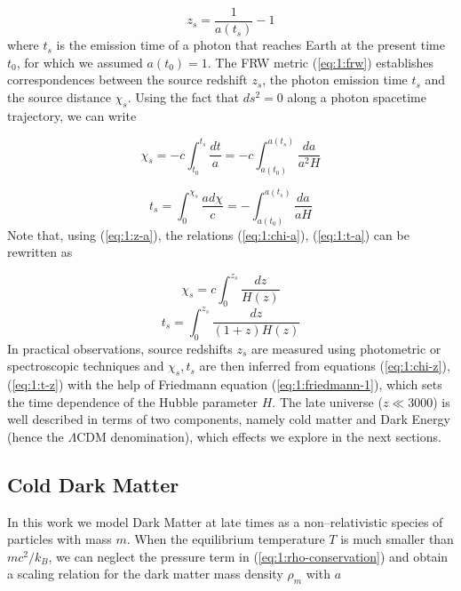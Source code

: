 \begin{equation}
\label{eq:1:z-a}
z_s = \frac{1}{a(t_s)}-1
\end{equation}
%
where $t_s$ is the emission time of a photon that reaches Earth at the present time $t_0$, for which we assumed $a(t_0)=1$. The FRW metric (\ref{eq:1:frw}) establishes correspondences between the source redshift $z_s$, the photon emission time $t_s$ and the source distance $\chi_s$. Using the fact that $ds^2=0$ along a photon spacetime trajectory, we can write

\begin{equation}
\label{eq:1:chi-a}
\chi_s = -c\int_{t_0}^{t_s}\frac{dt}{a} = -c\int_{a(t_0)}^{a(t_s)}\frac{da}{a^2H}  
\end{equation}

\begin{equation}
\label{eq:1:t-a}
t_s = \int_{0}^{\chi_s}\frac{a d\chi}{c} = -\int_{a(t_0)}^{a(t_s)}\frac{da}{aH}  
\end{equation}
%
Note that, using (\ref{eq:1:z-a}), the relations (\ref{eq:1:chi-a}), (\ref{eq:1:t-a}) can be rewritten as 

\begin{equation}
\label{eq:1:chi-z}
\chi_s = c\int_0^{z_s}\frac{dz}{H(z)}
\end{equation} 
%
\begin{equation}
\label{eq:1:t-z}
t_s = \int_0^{z_s}\frac{dz}{(1+z)H(z)}
\end{equation} 
%
In practical observations, source redshifts $z_s$ are measured using photometric \citep{LSST} or spectroscopic \citep{DESI} techniques and $\chi_s,t_s$ are then inferred from equations (\ref{eq:1:chi-z}), (\ref{eq:1:t-z}) with the help of Friedmann equation (\ref{eq:1:friedmann-1}), which sets the time dependence of the Hubble parameter $H$. The late universe ($z\ll 3000$) is well described in terms of two components, namely cold matter and Dark Energy (hence the $\Lambda$CDM denomination), which effects we explore in the next sections. 

\subsection{Cold Dark Matter}
In this work we model Dark Matter at late times as a non--relativistic species of particles with mass $m$. When the equilibrium temperature $T$ is much smaller than $mc^2/k_B$, we can neglect the pressure term in (\ref{eq:1:rho-conservation}) and obtain a scaling relation for the dark matter mass density $\rho_m$ with $a$

